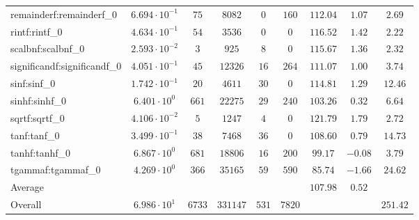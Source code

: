 \begin{tabular}{|l|c|c|c|c|c|c|c|c|}
remainderf:remainderf\_0     & $ 6.694 \cdot 10^{-1} $ & $ 75     $ & $ 8082   $ & $ 0   $ & $ 160  $ & $ 112.04      $ & $ 1.07    $ & $ 2.69    $ \\
rintf:rintf\_0               & $ 4.634 \cdot 10^{-1} $ & $ 54     $ & $ 3536   $ & $ 0   $ & $ 0    $ & $ 116.52      $ & $ 1.42    $ & $ 2.22    $ \\
scalbnf:scalbnf\_0           & $ 2.593 \cdot 10^{-2} $ & $ 3      $ & $ 925    $ & $ 8   $ & $ 0    $ & $ 115.67      $ & $ 1.36    $ & $ 2.32    $ \\
significandf:significandf\_0 & $ 4.051 \cdot 10^{-1} $ & $ 45     $ & $ 12326  $ & $ 16  $ & $ 264  $ & $ 111.07      $ & $ 1.00    $ & $ 3.74    $ \\
sinf:sinf\_0                 & $ 1.742 \cdot 10^{-1} $ & $ 20     $ & $ 4611   $ & $ 30  $ & $ 0    $ & $ 114.81      $ & $ 1.29    $ & $ 12.46   $ \\
sinhf:sinhf\_0               & $ 6.401 \cdot 10^{0}  $ & $ 661    $ & $ 22275  $ & $ 29  $ & $ 240  $ & $ 103.26      $ & $ 0.32    $ & $ 6.64    $ \\
sqrtf:sqrtf\_0               & $ 4.106 \cdot 10^{-2} $ & $ 5      $ & $ 1247   $ & $ 4   $ & $ 0    $ & $ 121.79      $ & $ 1.79    $ & $ 2.72    $ \\
tanf:tanf\_0                 & $ 3.499 \cdot 10^{-1} $ & $ 38     $ & $ 7468   $ & $ 36  $ & $ 0    $ & $ 108.60      $ & $ 0.79    $ & $ 14.73   $ \\
tanhf:tanhf\_0               & $ 6.867 \cdot 10^{0}  $ & $ 681    $ & $ 18806  $ & $ 16  $ & $ 200  $ & $ 99.17       $ & $ -0.08   $ & $ 3.79    $ \\
tgammaf:tgammaf\_0           & $ 4.269 \cdot 10^{0}  $ & $ 366    $ & $ 35165  $ & $ 59  $ & $ 590  $ & $ 85.74       $ & $ -1.66   $ & $ 24.62   $ \\
\hline
Average                      & $                     $ & $        $ & $        $ & $     $ & $      $ & $ 107.98      $ & $ 0.52    $ & $         $ \\
\hline
Overall                      & $ 6.986 \cdot 10^{1}  $ & $ 6733   $ & $ 331147 $ & $ 531 $ & $ 7820 $ & $             $ & $         $ & $ 251.42  $ \\
\hline
\end{tabular}
